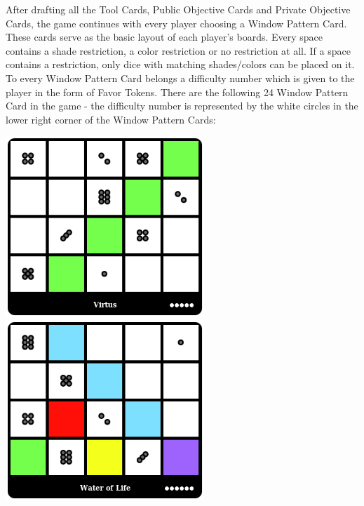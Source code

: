 After drafting all the Tool Cards, Public Objective Cards and Private Objective Cards, the game continues with every player choosing a Window
Pattern Card. These cards serve as the basic layout of each player's boards. Every space contains a shade restriction,
a color restriction or no restriction at all. If a space contains a restriction, only dice with matching shades/colors can be placed on it.
To every Window Pattern Card belongs a difficulty number which is given to the player in the form of Favor Tokens. There are the following 
24 Window Pattern Card in the game - the difficulty number is represented by the white circles in the lower right corner of the Window Pattern Cards:

\centerline{\mbox{\includegraphics[width=75mm]{img/WPC/Virtus.png}\includegraphics[width=75mm]{img/WPC/WaterofLife.png}}}
